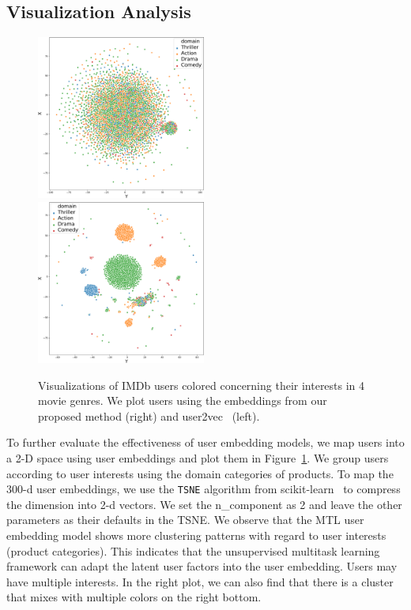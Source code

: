 \subsection{Visualization Analysis}

\begin{figure}[t!]
\centering
\includegraphics[width=0.495\textwidth]{./images/chapter4/uembedding/user2vec_emb_viz.pdf}
\includegraphics[width=0.495\textwidth]{./images/chapter4/uembedding/ours_emb_viz.pdf}
\caption{Visualizations of IMDb users colored concerning their interests in 4 movie genres. We plot users using the embeddings from our proposed method (right) and user2vec~\cite{amir2017quantifying} (left).}
\label{chap4:fig:uemb_viz}
\end{figure}

To further evaluate the effectiveness of user embedding models, we map users into a 2-D space using user embeddings and plot them in Figure~\ref{chap4:fig:uemb_viz}.
We group users according to user interests using the domain categories of products.
To map the 300-d user embeddings, we use the \texttt{TSNE} algorithm from scikit-learn~\cite{pedregosa2011scikit} to compress the dimension into 2-d vectors. We set the n\_component as 2 and leave the other parameters as their defaults in the TSNE.
We observe that the MTL user embedding model shows more clustering patterns with regard to user interests (product categories).
This indicates that the unsupervised multitask learning framework can adapt the latent user factors into the user embedding.
Users may have multiple interests. In the right plot, we can also find that there is a cluster that mixes with multiple colors on the right bottom.


